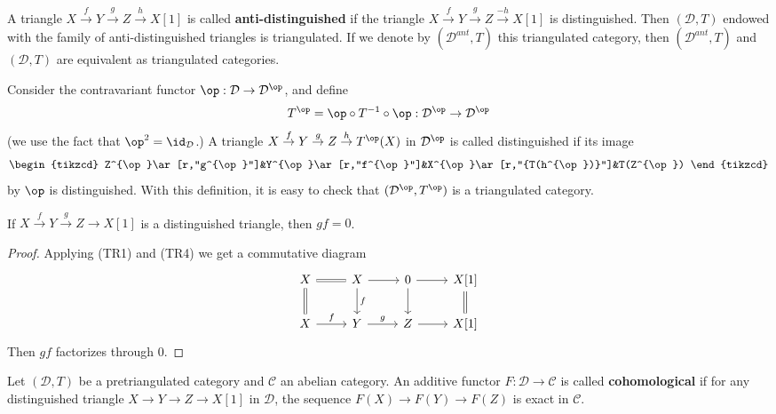 \begin{remark}
A triangle $X\stackrel{f}{\to} Y\stackrel{g}{\to} Z\stackrel{h}{\to} X[1]$ is called \textbf{anti-distinguished} if the triangle $X\stackrel{f}{\to} Y\stackrel{g}{\to} Z\stackrel{-h}{\to} X[1]$ is distinguished. Then $(\mathcal{D},T)$ endowed with the family of anti-distinguished triangles is triangulated. If we denote by $(\mathcal{D}^{ant},T)$ this triangulated category, then $(\mathcal{D}^{ant},T)$ and $(\mathcal{D},T)$ are equivalent as triangulated categories.
\end{remark}

\begin{remark}
Consider the contravariant functor $\op:\mathcal{D}\to\mathcal{D}^{\op}$, and define
\[T^{\op}=\op\circ T^{-1}\circ\op:\mathcal{D}^{\op}\to\mathcal{D}^{\op}\]
(we use the fact that $\op^2=\id_\mathcal{D}$.) A triangle $X\stackrel{f}{\to} Y\stackrel{g}{\to} Z\stackrel{h}{\to} T^{\op}(X)$ in $\mathcal{D}^{\op}$ is called distinguished if its image
\[\begin{tikzcd}
Z^{\op}\ar[r,"g^{\op}"]&Y^{\op}\ar[r,"f^{\op}"]&X^{\op}\ar[r,"{T(h^{\op})}"]&T(Z^{\op})
\end{tikzcd}
\]
by $\op$ is distinguished. With this definition, it is easy to check that $(\mathcal{D}^{\op},T^{\op})$ is a triangulated category.
\end{remark}

\begin{proposition}\label{triangle cat dt composition zero}
If $X\stackrel{f}{\to} Y\stackrel{g}{\to} Z\to X[1]$ is a distinguished triangle, then $gf=0$.
\end{proposition}
\begin{proof}
Applying (TR1) and (TR4) we get a commutative diagram
\[\begin{tikzcd}
X\ar[r,equal]\ar[d,equal]&X\ar[d,"f"]\ar[r]&0\ar[d]\ar[r]&X[1]\ar[d,equal]\\
X\ar[r,"f"]&Y\ar[r,"g"]&Z\ar[r]&X[1]
\end{tikzcd}\]
Then $gf$ factorizes through $0$.
\end{proof}

\begin{definition}
Let $(\mathcal{D},T)$ be a pretriangulated category and $\mathcal{C}$ an abelian category. An additive functor $F:\mathcal{D}\to\mathcal{C}$ is called \textbf{cohomological} if for any distinguished triangle $X\to Y\to Z\to X[1]$ in $\mathcal{D}$, the sequence $F(X)\to F(Y)\to F(Z)$ is exact in $\mathcal{C}$.
\end{definition}


